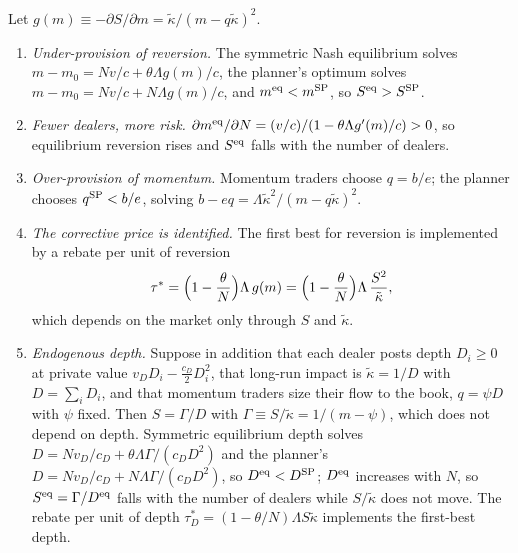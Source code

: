 \begin{proposition}\label{prop:equil}
Let $g(m)\equiv-\partial S/\partial m=\tilde\kappa/(m-q\tilde\kappa)^2$.
\begin{enumerate}[label=(\roman*)]
\item \emph{Under-provision of reversion.} The symmetric Nash equilibrium solves $m-m_0=N v/c+\theta\Lambda g(m)/c$, the planner's optimum solves $m-m_0=N v/c+N\Lambda g(m)/c$, and $m^{\rm eq}<m^{\rm SP}$, so $S^{\rm eq}>S^{\rm SP}$.
\item \emph{Fewer dealers, more risk.} $\partial m^{\rm eq}/\partial N=(v/c)/(1-\theta\Lambda g'(m)/c)>0$, so equilibrium reversion rises and $S^{\rm eq}$ falls with the number of dealers.
\item \emph{Over-provision of momentum.} Momentum traders choose $q=b/e$; the planner chooses $q^{\rm SP}<b/e$, solving $b-eq=\Lambda\tilde\kappa^2/(m-q\tilde\kappa)^2$.
\item \emph{The corrective price is identified.} The first best for reversion is implemented by a rebate per unit of reversion
\[
\tau^*=\Bigl(1-\frac\theta N\Bigr)\Lambda\,g(m)=\Bigl(1-\frac\theta N\Bigr)\Lambda\,\frac{S^2}{\tilde\kappa},
\]
which depends on the market only through $S$ and $\tilde\kappa$.
\item \emph{Endogenous depth.} Suppose in addition that each dealer posts depth $D_i\ge0$ at private value $v_DD_i-\tfrac{c_D}2D_i^2$, that long-run impact is $\tilde\kappa=1/D$ with $D=\sum_iD_i$, and that momentum traders size their flow to the book, $q=\psi D$ with $\psi$ fixed. Then $S=\Gamma/D$ with $\Gamma\equiv S/\tilde\kappa=1/(m-\psi)$, which does not depend on depth. Symmetric equilibrium depth solves $D=Nv_D/c_D+\theta\Lambda\Gamma/(c_DD^2)$ and the planner's $D=Nv_D/c_D+N\Lambda\Gamma/(c_DD^2)$, so $D^{\rm eq}<D^{\rm SP}$; $D^{\rm eq}$ increases with $N$, so $S^{\rm eq}=\Gamma/D^{\rm eq}$ falls with the number of dealers while $S/\tilde\kappa$ does not move. The rebate per unit of depth $\tau_D^*=(1-\theta/N)\Lambda S\tilde\kappa$ implements the first-best depth.
\end{enumerate}
\end{proposition}

